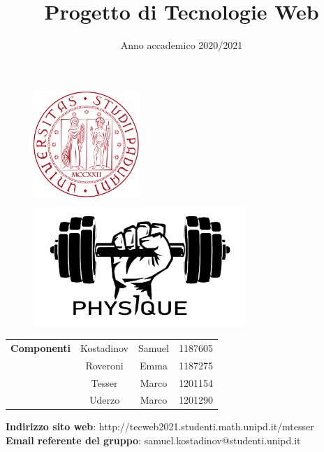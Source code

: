 
\title{Progetto di Tecnologie Web}
\date{Anno accademico 2020/2021}


\maketitle
\begin{figure}[H]
	\centering
	\includegraphics[width=4cm]{img/unipd.png}
\end{figure}
\begin{figure}[H]
	\centering
	\includegraphics[width=8cm]{img/logo.png}
\end{figure}
\begin{table}[H]
	\centering
	\begin{tabular}{c|c c c}
		\textbf{Componenti} & Kostadinov     & Samuel  & 1187605 \\
		                    & Roveroni       & Emma    & 1187275 \\
		                    & Tesser         & Marco   & 1201154 \\
		                    & Uderzo         & Marco   & 1201290 \\
	\end{tabular}
\end{table}

\begin{center}
	\textbf{Indirizzo sito web}: http://tecweb2021.studenti.math.unipd.it/mtesser\\
	\textbf{Email referente del gruppo}: samuel.kostadinov@studenti.unipd.it
\end{center}

